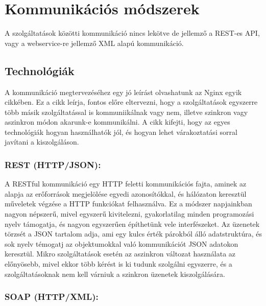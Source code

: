 \documentclass[11pt,magyar,a4paper,oneside,]{report}
\begin{document}
\chapter{Kommunikációs
módszerek}\label{kommunikuxe1ciuxf3s-muxf3dszerek}

A szolgáltatások közötti kommunikáció nincs lekötve de jellemző a
REST-es API, vagy a webservice-re jellemző XML alapú
kommunikáció\citep{rest-soap}.

\section{Technológiák}\label{technoluxf3giuxe1k}

A kommunikáció megtervezéséhez egy jó leírást olvashatunk az Nginx egyik
cikkében\citep{micro-communication}. Ez a cikk leírja, fontos előre
eltervezni, hogy a szolgáltatások egyszerre több másik szolgáltatással
is kommuniikálnak vagy nem, illetve szinkron vagy aszinkron módon
akarunk-e kommunikálni. A cikk kifejti, hogy az egyes technológiák
hogyan használhatók jól, és hogyan lehet várakoztatási sorral javítani a
kiszolgáláson.

\subsection{\texorpdfstring{REST
(HTTP/JSON)\citep{microservices-light}:}{REST (HTTP/JSON){[}@microservices-light{]}:}}\label{rest-httpjsonmicroservices-light}

A RESTful kommunikáció egy HTTP feletti kommunikációs fajta, aminek az
alapja az erőforrások megjelölése egyedi azonosítókkal, és hálózaton
keresztül műveletek végzése a HTTP funkciókat felhasználva. Ez a módszer
napjainkban nagyon népszerű, mivel egyszerű kivitelezni, gyakorlatilag
minden programozási nyelv támogatja, és nagyon egyszerűen építhetünk
vele interfészeket. Az üzenetek törzsét a JSON tartalom adja, ami egy
kulcs érték párokból álló adatstruktúra, és sok nyelv témogatj az
objektumokkal való kommunikációt JSON adatokon keresztül. Mikro
szolgáltatások esetén az aszinkron változat használata az
előnyösebb\citep{rest-async}, mivel ekkor több kérést is ki tudunk
szolgálni egyszerre, és a szolgáltatásoknak nem kell várniuk a szinkron
üzenetek kiszolgálására.

\subsection{\texorpdfstring{SOAP
(HTTP/XML)\citep{soap}:}{SOAP (HTTP/XML){[}@soap{]}:}}\label{soap-httpxmlsoap}
\end{document}

